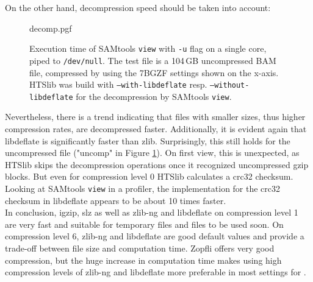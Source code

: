 On the other hand, decompression speed should be taken into account: 
\begin{figure}[t]
        {decomp.pgf}
    \caption{Execution time of SAMtools \texttt{view} with \texttt{-u} flag on a single core, piped to \texttt{/dev/null}. The test file is a 104\,GB uncompressed BAM file, compressed by \sort using the 7BGZF settings shown on the x-axis. HTSlib was build with \texttt{--with-libdeflate} resp. \texttt{--without-libdeflate} for the decompression by SAMtools \texttt{view}.}
    \label{fig:decomp}
\end{figure}
Nevertheless, there is a trend indicating that files with smaller sizes, thus higher compression rates, are decompressed faster. 
Additionally, it is evident again that libdeflate is significantly faster than zlib. Surprisingly, this still holds for the uncompressed file ("uncomp" in Figure \ref{fig:decomp}). On first view, this is unexpected, as HTSlib skips the decompression operations once it recognized uncompressed gzip blocks. But even for compression level 0 HTSlib calculates a crc32 checksum. Looking at SAMtools \texttt{view} in a profiler, the implementation for the crc32 checksum in libdeflate appears to be about 10 times faster. \\
In conclusion, igzip, slz as well as zlib-ng and libdeflate on compression level 1 are very fast and suitable for temporary files and files to be used soon. On compression level 6, zlib-ng and libdeflate are good default values and provide a trade-off between file size and computation time. Zopfli offers very good compression, but the huge increase in computation time makes using high compression levels of zlib-ng and libdeflate more preferable in most settings for \sort.

